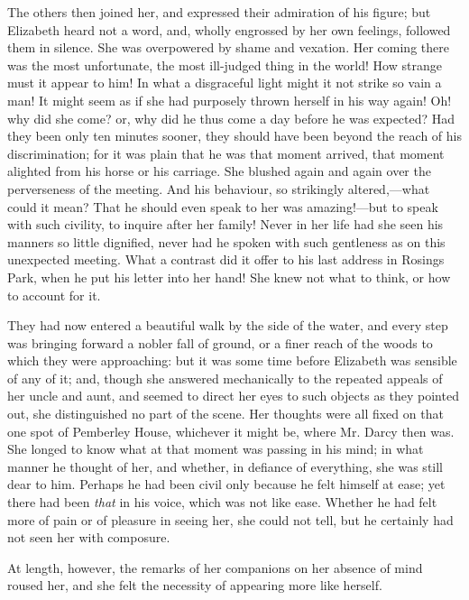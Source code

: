 \documentclass[12pt]{book}
\begin{document}
The others then joined her, and expressed their admiration of his figure; but Elizabeth heard not a word, and, wholly engrossed by her own feelings, followed them in silence. She was overpowered by shame and vexation. Her coming there was the most unfortunate, the most ill-judged thing in the world! How strange must it appear to him! In what a disgraceful light might it not strike so vain a man! It might seem as if she had purposely thrown herself in his way again! Oh! why did she come? or, why did he thus come a day before he was expected? Had they been only ten minutes sooner, they should have been beyond the reach of his discrimination; for it was plain that he was that moment arrived, that moment alighted from his horse or his carriage. She blushed again and again over the perverseness of the meeting. And his behaviour, so strikingly altered,---what could it mean? That he should even speak to her was amazing!---but to speak with such civility, to inquire after her family! Never in her life had she seen his manners so little dignified, never had he spoken with such gentleness as on this unexpected meeting. What a contrast did it offer to his last address in Rosings Park, when he put his letter into her hand! She knew not what to think, or how to account for it.

They had now entered a beautiful walk by the side of the water, and every step was bringing forward a nobler fall of ground, or a finer reach of the woods to which they were approaching: but it was some time before Elizabeth was sensible of any of it; and, though she answered mechanically to the repeated appeals of her uncle and aunt, and seemed to direct her eyes to such objects as they pointed out, she distinguished no part of the scene. Her thoughts were all fixed on that one spot of Pemberley House, whichever it might be, where Mr. Darcy then was. She longed to know what at that moment was passing in his mind; in what manner he thought of her, and whether, in defiance of everything, she was still dear to him. Perhaps he had been civil only because he felt himself at ease; yet there had been \textit{that} in his voice, which was not like ease. Whether he had felt more of pain or of pleasure in seeing her, she could not tell, but he certainly had not seen her with composure.

At length, however, the remarks of her companions on her absence of mind roused her, and she felt the necessity of appearing more like herself.
\end{document}
